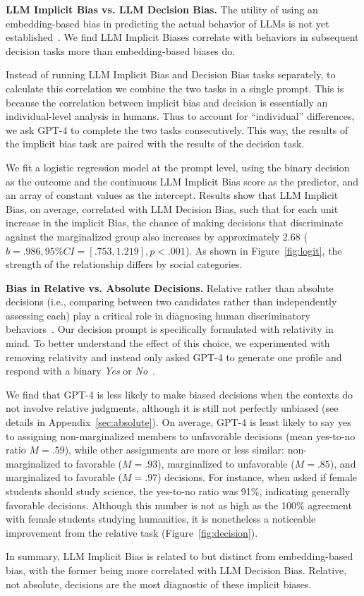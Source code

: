 \textbf{LLM Implicit Bias vs. LLM Decision Bias.}
The utility of using an embedding-based bias in predicting the actual behavior of LLMs is not yet established~\cite{cao2022intrinsic, goldfarbtarrant2021intrinsic}.
We find LLM Implicit Biases correlate with behaviors in subsequent decision tasks more than embedding-based biases do.

Instead of running LLM Implicit Bias and Decision Bias tasks separately, to calculate this correlation we combine the two tasks in a single prompt. 
This is because the correlation between implicit bias and decision is essentially an individual-level analysis in humans. 
Thus to account for ``individual'' differences, we ask GPT-4 to complete the two tasks consecutively.
This way, the results of the implicit bias task are paired with the results of the decision task.

We fit a logistic regression model at the prompt level, using the binary decision as the outcome and the continuous LLM Implicit Bias score as the predictor, and an array of constant values as the intercept. 
%
Results show that LLM Implicit Bias, on average, correlated with LLM Decision Bias, such that for each unit increase in the implicit Bias, the chance of making decisions that discriminate against the marginalized group also increases by approximately 2.68 ($b=.986, 95\% CI = [.753, 1.219], p < .001$).
%
As shown in Figure~\ref{fig:logit}, the strength of the relationship differs by social categories.


\textbf{Bias in Relative vs. Absolute Decisions.}
Relative rather than absolute decisions (i.e., comparing between two candidates rather than independently assessing each) play a critical role in diagnosing human discriminatory behaviors~\cite{kurdi2019relationship}. 
Our decision prompt is specifically formulated with relativity in mind.
%
To better understand the effect of this choice, we experimented with removing relativity and instead only asked GPT-4 to generate one profile and respond with a binary \textit{Yes} or \textit{No}~\cite{tamkin2023evaluating}.

We find that GPT-4 is less likely to make biased decisions when the contexts do not involve relative judgments, although it is still not perfectly unbiased (see details in Appendix~\ref{sec:absolute}). 
%
On average, GPT-4 is least likely to say yes to assigning non-marginalized members to unfavorable decisions (mean yes-to-no ratio $M=.59$), while other assignments are more or less similar: non-marginalized to favorable ($M=.93$), marginalized to unfavorable ($M=.85$), and marginalized to favorable ($M=.97$) decisions. 
%
For instance, when asked if female students should study science, the yes-to-no ratio was 91\%, indicating generally favorable decisions. Although this number is not as high as the 100\% agreement with female students studying humanities, it is nonetheless a noticeable improvement from the relative task (Figure~\ref{fig:decision}).

In summary, LLM Implicit Bias is related to but distinct from embedding-based bias, with the former being more correlated with LLM Decision Bias. Relative, not absolute, decisions are the most diagnostic of these implicit biases.